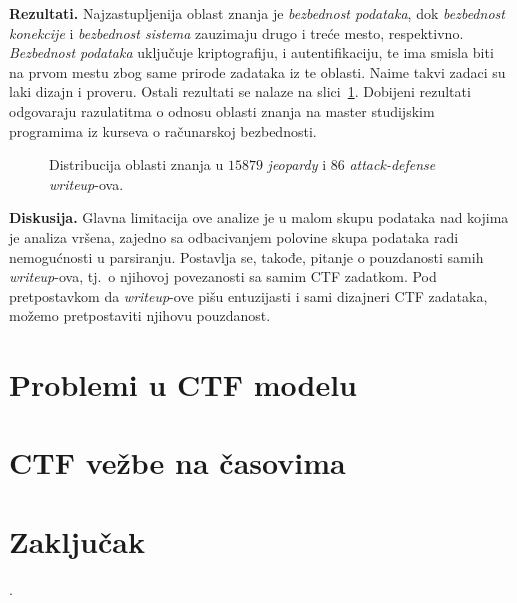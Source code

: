 \documentclass[12pt, a4paper, twocolumn]{article}
\begin{document}
\textbf{Rezultati.} Najzastupljenija oblast znanja je 
\emph{bezbednost podataka}, dok \emph{bezbednost konekcije} i 
\emph{bezbednost sistema} zauzimaju drugo i treće mesto, respektivno. 
\emph{Bezbednost podataka} uključuje kriptografiju, i autentifikaciju, te ima 
smisla biti na prvom mestu zbog same prirode zadataka iz te oblasti. Naime 
takvi zadaci su laki dizajn i proveru. Ostali rezultati se nalaze na 
slici~\ref{fig:ctf_ka}.\cite{ctf_skills} Dobijeni rezultati odgovaraju 
razulatitma o odnosu oblasti znanja na master studijskim programima iz 
kurseva o računarskoj bezbednosti.\cite{oth_ka, ctf_skills}

\begin{figure}
\begin{center}
\end{center}
\caption{Distribucija oblasti znanja u $15 879$ \emph{jeopardy} i $86$ \emph{attack-defense} \emph{writeup}-ova.}\label{fig:ctf_ka}
\end{figure}

\textbf{Diskusija.} Glavna limitacija ove analize je u malom skupu podataka nad kojima je analiza vršena, zajedno sa odbacivanjem polovine skupa podataka radi nemogućnosti u parsiranju.\cite{ctf_skills} Postavlja se, takođe, pitanje o 
pouzdanosti samih \emph{writeup}-ova, tj.\ o njihovoj povezanosti sa samim
CTF zadatkom. Pod pretpostavkom da \emph{writeup}-ove pišu entuzijasti i sami
dizajneri CTF zadataka, možemo pretpostaviti njihovu pouzdanost.

\section{Problemi u CTF modelu}



\section{CTF vežbe na časovima}

\section{Zaključak}

\nocite{*}

\printbibliography.
\end{document}
